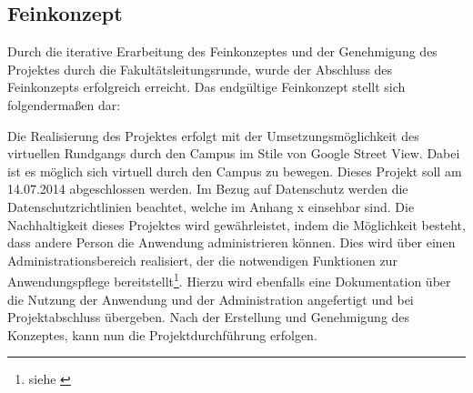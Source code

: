 \subsection{Feinkonzept}
\label{sec:Feinkonzept}

Durch die iterative Erarbeitung des Feinkonzeptes und der Genehmigung des
Projektes durch die Fakultätsleitungsrunde, wurde der Abschluss des Feinkonzepts
erfolgreich erreicht. Das endgültige Feinkonzept stellt sich folgendermaßen dar:

Die Realisierung des Projektes erfolgt mit der Umsetzungsmöglichkeit des
virtuellen Rundgangs durch den Campus im Stile von Google Street View. Dabei ist
es möglich sich virtuell durch den Campus zu bewegen. Dieses Projekt soll am
14.07.2014 abgeschlossen werden. Im Bezug auf Datenschutz werden die
Datenschutzrichtlinien beachtet, welche im Anhang x einsehbar sind. Die
Nachhaltigkeit dieses Projektes wird gewährleistet, indem die Möglichkeit
besteht, dass andere Person die Anwendung administrieren können. Dies wird über
einen Administrationsbereich realisiert, der die notwendigen Funktionen zur
Anwendungspflege bereitstellt\footnote{siehe \citet{lastenheft2013}}. Hierzu
wird ebenfalls eine Dokumentation über die Nutzung der Anwendung und der
Administration angefertigt und bei Projektabschluss übergeben. 
Nach der Erstellung und Genehmigung des Konzeptes, kann nun die
Projektdurchführung erfolgen.

